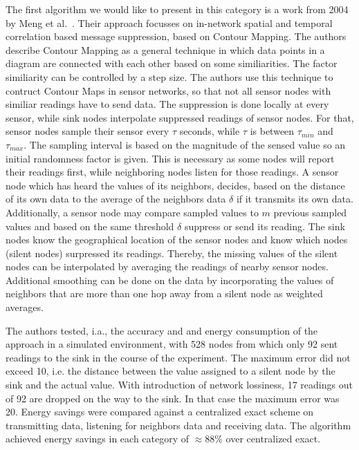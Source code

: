 \label{sec:Adaptive Filtering}

The first algorithm we would like to present in this category is a work from
2004 by Meng et al.~\cite{meng2004event}. Their approach focusses on in-network
spatial and temporal correlation based message suppression, based on Contour
Mapping. The authors describe Contour Mapping as a general technique in which
data points in a diagram are connected with each other based on some
similiarities. The factor similiarity can be controlled by a step size. The
authors use this technique to contruct Contour Maps in sensor networks, so that
not all sensor nodes with similiar readings have to send data. The suppression
is done locally at every sensor, while sink nodes interpolate suppressed
readings of sensor nodes. For that, sensor nodes sample their sensor every $
\tau $ seconds, while $ \tau $ is between $ \tau_{min} $ and $ \tau_{max} $.
The sampling interval is based on the magnitude of the sensed value so an
initial randomness factor is given. This is necessary as some nodes will report
their readings first, while neighboring nodes listen for those readings. A
sensor node which has heard the values of its neighbors, decides, based on the
distance of its own data to the average of the neighbors data $ \delta $ if it
transmits its own data. Additionally, a sensor node may compare sampled values
to $ m $ previous sampled values and based on the same threshold $ \delta $
suppress or send its reading. The sink nodes know the geographical location of
the sensor nodes and know which nodes (silent nodes) surpressed its readings.
Thereby, the missing values of the silent nodes can be interpolated by
averaging the readings of nearby sensor nodes. Additional smoothing can be done
on the data by incorporating the values of neighbors that are more than one hop
away from a silent node as weighted averages.

The authors tested, i.a., the accuracy and and energy consumption of the
approach in a simulated environment, with 528 nodes from which only 92 sent
readings to the sink in the course of the experiment. The maximum error did not
exceed 10, i.e. the distance between the value assigned to a silent node by the
sink and the actual value. With introduction of network lossiness, 17 readings
out of 92 are dropped on the way to the sink. In that case the maximum error
was 20. Energy savings were compared against a centralized exact scheme on
transmitting data, listening for neighbors data and receiving data. The
algorithm achieved energy savings in each category of $ \approx88\% $ over
centralized exact. 

